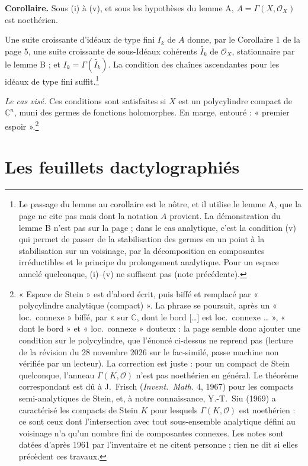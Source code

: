\documentclass[11pt,a4paper]{article}
\begin{document}
\textbf{Corollaire.} Sous (i) à (v), et sous les hypothèses du lemme A,
$A = \Gamma(X, \mathcal{O}_{X})$ est noethérien.

Une suite croissante d'idéaux de type fini $I_{k}$ de $A$ donne, par le
Corollaire 1 de la page 5, une suite croissante de sous-Idéaux cohérents
$\widetilde{I_{k}}$ de $\mathcal{O}_{X}$, stationnaire par le lemme B ; et
$I_{k} = \Gamma(\widetilde{I_{k}})$. La condition des chaînes ascendantes pour
les idéaux de type fini suffit.\footnote{Le passage du lemme au corollaire est
le nôtre, et il utilise le lemme A, que la page ne cite pas mais dont la
notation $A$ provient. La démonstration du lemme B n'est pas sur la page ; dans le cas
analytique, c'est la condition (v) qui permet de passer de la
stabilisation des germes en un point à la stabilisation sur un voisinage, par
la décomposition en composantes irréductibles et le principe du prolongement
analytique. Pour un espace annelé quelconque, (i)--(v) ne suffisent pas
(note précédente).}

\emph{Le cas visé.} Ces conditions sont satisfaites si $X$ est un polycylindre
compact de $\mathbb{C}^{n}$, muni des germes de fonctions holomorphes. En marge,
entouré : « premier espoir ».\footnote{« Espace de Stein » est d'abord écrit,
puis biffé et remplacé par « polycylindre analytique (compact) ». La phrase
se poursuit, après un « loc.\ connexe » biffé, par « sur $\mathbb{C}$, dont le
bord […] est loc.\ connexe … », « dont le bord » et « loc.\ connexe »
douteux : la page semble donc ajouter une condition sur le polycylindre, que
l'énoncé ci-dessus ne reprend pas (lecture de la révision du 28 novembre 2026
sur le fac-similé, passe machine non vérifiée par un lecteur). La
correction est juste : pour un compact de Stein quelconque, l'anneau
$\Gamma(K, \mathcal{O})$ n'est pas noethérien en général. Le théorème
correspondant est dû à J.~Frisch (\emph{Invent.\ Math.} 4, 1967) pour les
compacts semi-analytiques de Stein, et, à notre connaissance, Y.-T.~Siu (1969) a caractérisé les
compacts de Stein $K$ pour lesquels $\Gamma(K, \mathcal{O})$ est noethérien :
ce sont ceux dont l'intersection avec tout sous-ensemble analytique défini au
voisinage n'a qu'un nombre fini de composantes connexes. Les notes sont datées
d'après 1961 par l'inventaire et ne citent personne ; rien ne dit si elles
précèdent ces travaux.}

\section*{Les feuillets dactylographiés}
\end{document}
